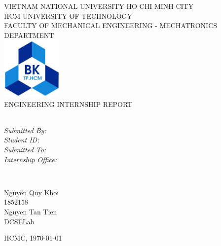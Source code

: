 \documentclass{presets}
\begin{document}
	\begin{titlepage}
		\centering
		\small VIETNAM NATIONAL UNIVERSITY HO CHI MINH CITY\\
		HCM UNIVERSITY OF TECHNOLOGY\\
		FACULTY OF MECHANICAL ENGINEERING - MECHATRONICS DEPARTMENT\\[2cm]
		
		\includegraphics[width=3cm]{logo.png}\\[2 cm]	%
		\normalsize ENGINEERING INTERNSHIP REPORT\\[1 cm]
		{\huge \bfseries \thetitle}\\[2cm]
		
		\begin{minipage}[t]{0.4\textwidth}
			\begin{flushleft} \large
				\emph{Submitted By:}\\
				\emph{Student ID:}\\
				\emph{Submitted To:}\\
				\emph{Internship Office:}\\
			\end{flushleft}
		\end{minipage}~
		\begin{minipage}[t]{0.4\textwidth}
			
			\begin{flushright} \large
				Nguyen Quy Khoi\\
				1852158\\
				Nguyen Tan Tien\\
				DCSELab\\
			\end{flushright}
			
		\end{minipage}
		\mbox{}\vfill
		{\large HCMC, \today}
	\end{titlepage}
	\tableofcontents
	\listoffigures
\end{document}
